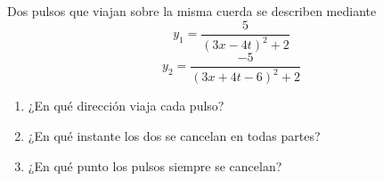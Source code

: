 \item Dos pulsos que viajan sobre la misma cuerda se describen mediante
$$ y_1 = \frac{5}{(3x - 4t)^2 + 2} $$
$$ y_2 = \frac{-5}{(3x + 4t - 6)^2 + 2} $$
\begin{enumerate}
    \item ¿En qué dirección viaja cada pulso?
    \item ¿En qué instante los dos se cancelan en todas partes?
    \item ¿En qué punto los pulsos siempre se cancelan?
\end{enumerate}